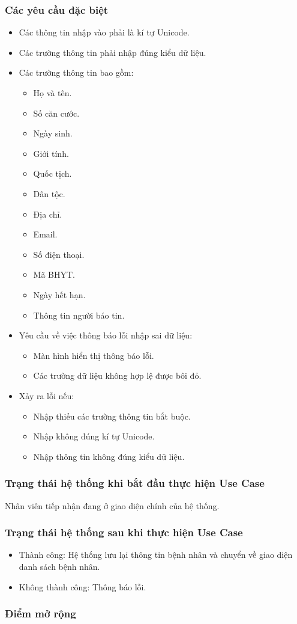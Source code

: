 \subsubsection{Các yêu cầu đặc biệt}
\begin{itemize}
  \item Các thông tin nhập vào phải là kí tự Unicode.
  \item Các trường thông tin phải nhập đúng kiểu dữ liệu.
  \item Các trường thông tin bao gồm:
  \begin{itemize}
    \item Họ và tên.
    \item Số căn cước.
    \item Ngày sinh.
    \item Giới tính.
    \item Quốc tịch.
    \item Dân tộc.
    \item Địa chỉ.
    \item Email.
    \item Số điện thoại.
    \item Mã BHYT.
    \item Ngày hết hạn.
    \item Thông tin người báo tin.
  \end{itemize}
  \item Yêu cầu về việc thông báo lỗi nhập sai dữ liệu:
  \begin{itemize}
    \item Màn hình hiển thị thông báo lỗi.
    \item Các trường dữ liệu không hợp lệ được bôi đỏ.
  \end{itemize}
  \item Xảy ra lỗi nếu:
  \begin{itemize}
    \item Nhập thiếu các trường thông tin bắt buộc.
    \item Nhập không đúng kí tự Unicode.
    \item Nhập thông tin không đúng kiểu dữ liệu.
  \end{itemize}
\end{itemize}

\subsubsection{Trạng thái hệ thống khi bắt đầu thực hiện Use Case}
Nhân viên tiếp nhận đang ở giao diện chính của hệ thống.

\subsubsection{Trạng thái hệ thống sau khi thực hiện Use Case}
\begin{itemize}
  \item Thành công: Hệ thống lưu lại thông tin bệnh nhân và chuyển về giao diện danh sách bệnh nhân.
  \item Không thành công: Thông báo lỗi.
\end{itemize}

\subsubsection{Điểm mở rộng}
